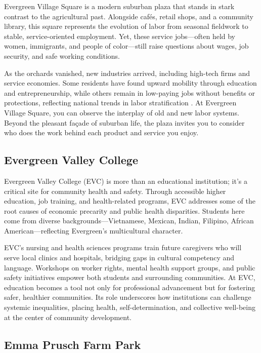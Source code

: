 \documentclass[12pt]{article}
\begin{document}
Evergreen Village Square is a modern suburban plaza that stands in stark contrast to the agricultural past. Alongside cafés, retail shops, and a community library, this square represents the evolution of labor from seasonal fieldwork to stable, service-oriented employment. Yet, these service jobs—often held by women, immigrants, and people of color—still raise questions about wages, job security, and safe working conditions.

As the orchards vanished, new industries arrived, including high-tech firms and service economies. Some residents have found upward mobility through education and entrepreneurship, while others remain in low-paying jobs without benefits or protections, reflecting national trends in labor stratification \cite{Cohen2011}. At Evergreen Village Square, you can observe the interplay of old and new labor systems. Beyond the pleasant façade of suburban life, the plaza invites you to consider who does the work behind each product and service you enjoy.

\subsection{Evergreen Valley College}

Evergreen Valley College (EVC) is more than an educational institution; it’s a critical site for community health and safety. Through accessible higher education, job training, and health-related programs, EVC addresses some of the root causes of economic precarity and public health disparities. Students here come from diverse backgrounds—Vietnamese, Mexican, Indian, Filipino, African American—reflecting Evergreen’s multicultural character.

EVC’s nursing and health sciences programs train future caregivers who will serve local clinics and hospitals, bridging gaps in cultural competency and language. Workshops on worker rights, mental health support groups, and public safety initiatives empower both students and surrounding communities. At EVC, education becomes a tool not only for professional advancement but for fostering safer, healthier communities. Its role underscores how institutions can challenge systemic inequalities, placing health, self-determination, and collective well-being at the center of community development.

\subsection{Emma Prusch Farm Park}
\end{document}
